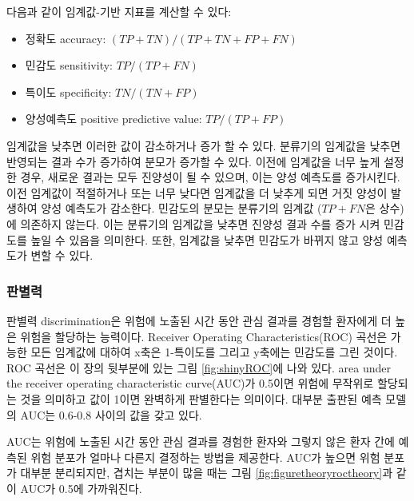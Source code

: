 \documentclass[10.5pt]{book}
\providecommand{\tightlist}{%
  \setlength{\itemsep}{0pt}\setlength{\parskip}{0pt}}
\theoremstyle{definition}
\theoremstyle{definition}
\theoremstyle{definition}
\theoremstyle{remark}
\begin{document}
다음과 같이 임계값-기반 지표를 계산할 수 있다:

\begin{itemize}
\tightlist
\item
  정확도 accuracy: \((TP+TN)/(TP+TN+FP+FN)\)
\item
  민감도 sensitivity: \(TP/(TP+FN)\)
\item
  특이도 specificity: \(TN/(TN+FP)\)
\item
  양성예측도 positive predictive value: \(TP/(TP+FP)\)
\end{itemize}

임계값을 낮추면 이러한 값이 감소하거나 증가 할 수 있다. 분류기의
임계값을 낮추면 반영되는 결과 수가 증가하여 분모가 증가할 수 있다.
이전에 임계값을 너무 높게 설정한 경우, 새로운 결과는 모두 진양성이 될 수
있으며, 이는 양성 예측도를 증가시킨다. 이전 임계값이 적절하거나 또는
너무 낮다면 임계값을 더 낮추게 되면 거짓 양성이 발생하여 양성 예측도가
감소한다. 민감도의 분모는 분류기의 임계값 (\(TP+FN\)은 상수)에 의존하지
않는다. 이는 분류기의 임계값을 낮추면 진양성 결과 수를 증가 시켜
민감도를 높일 수 있음을 의미한다. 또한, 임계값을 낮추면 민감도가 바뀌지
않고 양성 예측도가 변할 수 있다.

\subsubsection*{판별력}

판별력 discrimination은 위험에 노출된 시간 동안 관심 결과를 경험할
환자에게 더 높은 위험을 할당하는 능력이다. Receiver Operating
Characteristics(ROC) 곡선은 가능한 모든 임계값에 대하여 x축은 1-특이도를
그리고 y축에는 민감도를 그린 것이다. ROC 곡선은 이 장의 뒷부분에 있는
그림 \ref{fig:shinyROC}에 나와 있다. area under the receiver operating
characteristic curve(AUC)가 0.5이면 위험에 무작위로 할당되는 것을
의미하고 값이 1이면 완벽하게 판별한다는 의미이다. 대부분 출판된 예측
모델의 AUC는 0.6-0.8 사이의 값을 갖고 있다.  

AUC는 위험에 노출된 시간 동안 관심 결과를 경험한 환자와 그렇지 않은 환자
간에 예측된 위험 분포가 얼마나 다른지 결정하는 방법을 제공한다. AUC가
높으면 위험 분포가 대부분 분리되지만, 겹치는 부분이 많을 때는 그림
\ref{fig:figuretheoryroctheory}과 같이 AUC가 0.5에 가까워진다.
\end{document}
